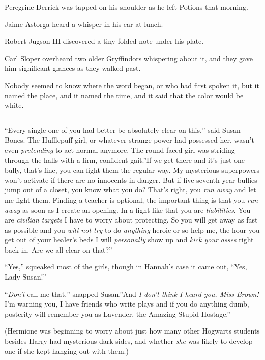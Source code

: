 Peregrine Derrick was tapped on his shoulder as he left Potions that
morning.

Jaime Astorga heard a whisper in his ear at lunch.

Robert Jugson III discovered a tiny folded note under his plate.

Carl Sloper overheard two older Gryffindors whispering about it, and
they gave him significant glances as they walked past.

Nobody seemed to know where the word began, or who had first spoken it,
but it named the place, and it named the time, and it said that the
color would be white.

\begin{center}\rule{3in}{0.4pt}\end{center}

``Every single one of you had better be absolutely clear on this,'' said
Susan Bones. The Hufflepuff girl, or whatever strange power had
possessed her, wasn't even \emph{pretending} to act normal anymore. The
round-faced girl was striding through the halls with a firm, confident
gait.''If we get there and it's just one bully, that's fine, you can
fight them the regular way. My mysterious superpowers won't activate if
there are no innocents in danger. But if five seventh-year bullies jump
out of a closet, you know what you do? That's right, you \emph{run away}
and let me fight them. Finding a teacher is optional, the important
thing is that you \emph{run away} as soon as I create an opening. In a
fight like that you are \emph{liabilities}. You are \emph{civilian
targets} I have to worry about protecting. So you will get away as fast
as possible and you \emph{will not try} to do \emph{anything} heroic or
so help me, the hour you get out of your healer's beds I will
\emph{personally} show up and \emph{kick your asses} right back in. Are
we all clear on that?''

``Yes,'' squeaked most of the girls, though in Hannah's case it came
out, ``Yes, Lady Susan!''

``\emph{Don't} call me that,'' snapped Susan.''And \emph{I don't think I
heard you, Miss Brown!} I'm warning you, I have friends who write plays
and if you do anything dumb, posterity will remember you as Lavender,
the Amazing Stupid Hostage.''

(Hermione was beginning to worry about just how many other Hogwarts
students besides Harry had mysterious dark sides, and whether \emph{she}
was likely to develop one if she kept hanging out with them.)

